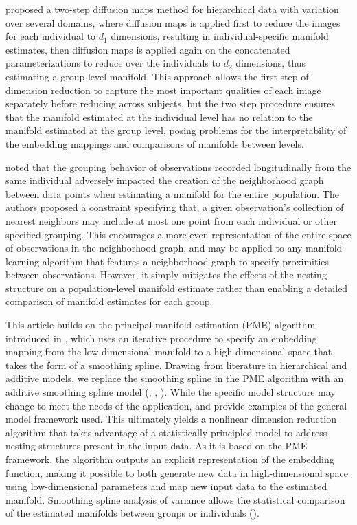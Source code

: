 \documentclass[11pt,reqno]{article}
\theoremstyle{definition}
\begin{document}
\cite{gaoHierarchicalManifoldLearning2019} proposed a two-step diffusion maps method for hierarchical data with variation over several domains, where diffusion maps is applied first to reduce the images for each individual to $d_1$ dimensions, resulting in individual-specific manifold estimates, then diffusion maps is applied again on the concatenated parameterizations to reduce over the individuals to $d_2$ dimensions, thus estimating a group-level manifold. This approach allows the first step of dimension reduction to capture the most important qualities of each image separately before reducing across subjects, but the two step procedure ensures that the manifold estimated at the individual level has no relation to the manifold estimated at the group level, posing problems for the interpretability of the embedding mappings and comparisons of manifolds between levels.

\cite{guerreroGroupconstrainedManifoldLearning2017} noted that the grouping behavior of observations recorded longitudinally from the same individual adversely impacted the creation of the neighborhood graph between data points when estimating a manifold for the entire population. The authors proposed a constraint specifying that, a given observation's collection of nearest neighbors may include at most one point from each individual or other specified grouping. This encourages a more even representation of the entire space of observations in the neighborhood graph, and may be applied to any manifold learning algorithm that features a neighborhood graph to specify proximities between observations. However, it simply mitigates the effects of the nesting structure on a population-level manifold estimate rather than enabling a detailed comparison of manifold estimates for each group.

This article builds on the principal manifold estimation (PME) algorithm introduced in \cite{mengPrincipalManifoldEstimation2021}, which uses an iterative procedure to specify an embedding mapping from the low-dimensional manifold to a high-dimensional space that takes the form of a smoothing spline. Drawing from literature in hierarchical and additive models, we replace the smoothing spline in the PME algorithm with an additive smoothing spline model (\cite{gelmanDataAnalysisUsing2007}, \cite{hastieGeneralizedAdditiveModels1990}, \cite{gelmanBayesianDataAnalysis2014}). While the specific model structure may change to meet the needs of the application, \cite{brumbackSmoothingSplineModels1998} and \cite{schulamFrameworkIndividualizingPredictions2015a} provide examples of the general model framework used. This ultimately yields a nonlinear dimension reduction algorithm that takes advantage of a statistically principled model to address nesting structures present in the input data. As it is based on the PME framework, the algorithm outputs an explicit representation of the embedding function, making it possible to both generate new data in high-dimensional space using low-dimensional parameters and map new input data to the estimated manifold. Smoothing spline analysis of variance allows the statistical comparison of the estimated manifolds between groups or individuals (\cite{wangMixedEffectsSmoothing1998}).
\end{document}
